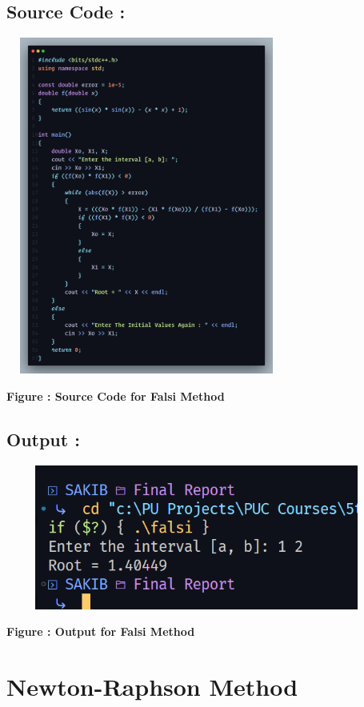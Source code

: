 \documentclass{scrreprt}
\begin{document}
\subsection*{Source Code : }
\begin{center}
    {\includegraphics[width=350px, height=420px]{falsi_code.png}}
    \parbox{0.8\textwidth}{ 
        \centering
        \textbf{Figure : Source Code for Falsi Method}
    }
\end{center}
\subsection*{Output : }
\begin{center}
    {\includegraphics[width=475px, height=180px]{falsi_output1.png}}
    \parbox{0.8\textwidth}{ 
        \centering
        \textbf{Figure : Output for Falsi Method}
    }
\end{center}

\section*{Newton-Raphson Method}
\end{document}
